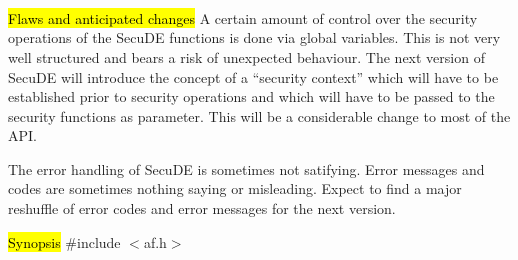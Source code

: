  \\
 \\
 \\
 \\
 \\
 \\
 \\
 \\
 \\
 \\
 \\
 \\
 \\

\hl{Flaws and anticipated changes}
A certain amount of control over the security operations of the SecuDE
functions is done via global variables. This is not very well structured
and bears a risk of unexpected behaviour. The next version of SecuDE
will introduce the concept of a  ``security context'' which will have 
to be established prior to security operations and which will have to be passed
to the security functions as parameter. This will be a considerable change
to most of the API.

The error handling of SecuDE is sometimes not satifying. Error messages and codes
are sometimes nothing saying or misleading. Expect to find a major reshuffle
of error codes and error messages for the next version.

\label{af_cadb_add_Certificate}
\hl{Synopsis}
\#include $<$af.h$>$


